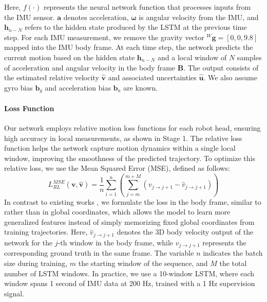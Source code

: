 Here, \( f(\cdot) \) represents the neural network function that processes inputs from the IMU sensor. \( \mathbf{a} \) denotes acceleration, \( \boldsymbol{\omega} \) is angular velocity from the IMU, and \( \mathbf{h}_{n-N} \) refers to the hidden state produced by the LSTM at the previous time step. For each IMU measurement, we remove the gravity vector \( ^W \mathbf{g} = [0, 0, 9.8] \) mapped into the  IMU body frame. At each time step, the network predicts the current motion based on the hidden state \( \mathbf{h}_{n-N} \) and a local window of \( N \) samples of acceleration and angular velocity in the body frame \( \mathbf{B} \). The output consists of the estimated relative velocity \( \hat{\mathbf{v}} \) and associated uncertainties \( \hat{\mathbf{u}} \). We also assume gyro bias $\mathbf{b}_g$ and acceleration bias $\mathbf{b}_a$ are known.




\paragraph{Loss Function}
Our network employs relative motion loss functions for each robot head, ensuring high accuracy in local measurements, as shown in  Stage 1. The relative loss function helps the network capture motion dynamics within a single local window, improving the smoothness of the predicted trajectory. To optimize this relative loss, we use the Mean Squared Error (MSE), defined as follows:
\begin{equation}
L_{RL}^{MSE}(\mathbf{v}, \hat{\mathbf{v}}) = \frac{1}{n} \sum_{i=1}^{n} \left(\sum_{j=m}^{m+M} \left( v_{j \rightarrow j+1} - \hat{v}_{j \rightarrow j+1} \right)\right) 
\end{equation}
In contrast to existing works \cite{liu2020tlio}\cite{rnin-vio}, we formulate the loss in the body frame, similar to \cite{airio} rather than in global coordinates, which allows the model to learn more generalized features instead of simply memorizing fixed global coordinates from training trajectories. Here, \(\hat{v}_{j \rightarrow j+1}\) denotes the 3D body velocity output of the network for the \(j\)-th window in the body frame, while \(v_{j \rightarrow j+1}\) represents the corresponding ground truth in the same frame. The variable \(n\) indicates the batch size during training, \(m\) the starting window of the sequence, and \(M\) the total number of LSTM windows. In practice, we use a 10-window LSTM, where each window spans 1 second of IMU data at 200 Hz, trained with a 1 Hz supervision signal.


